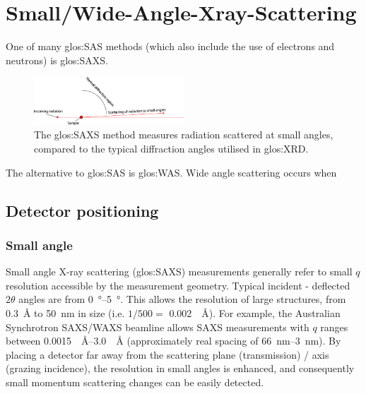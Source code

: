 \documentclass[../main.tex]{subfiles}
\begin{document}
	\chapter{Small/Wide-Angle-Xray-Scattering}\label{chap:05-saxs-waxs}
		One of many \gls{glos:SAS} methods (which also include the use of electrons and neutrons) is \gls{glos:SAXS}.
		
		\begin{figure}[H]
			\centering
			\includegraphics[width=0.5\textwidth]{resources/ch5/cm440881f1_hr}
			\caption{The \acrfull{glos:SAXS} method measures radiation scattered at small angles, compared to the typical diffraction angles utilised in \gls{glos:XRD}.}
			\label{fig:ch5-SAXS}
		\end{figure}
		
		The alternative to \gls{glos:SAS} is \gls{glos:WAS}. Wide angle scattering occurs when 
		
		\section{Detector positioning}
			\subsection{Small angle}
				Small angle X-ray scattering (\gls{glos:SAXS}) measurements generally refer to small $q$ resolution accessible by the measurement geometry. Typical incident - deflected $2\theta$ angles are from \qtyrange{0}{5}{\degree}. This allows the resolution of large structures, from \SI{0.3}{\angstrom} to \SI{50}{\nano\metre} in size (i.e. $1/500 = $ \SI{0.002}{\per\angstrom}). For example, the Australian Synchrotron SAXS/WAXS beamline allows SAXS measurements with $q$ ranges between \qtyrange{0.0015}{3.0}{\per\angstrom} (approximately real spacing of \qtyrange{66}{3}{\nano\metre}). By placing a detector far away from the scattering plane (transmission) / axis (grazing incidence), the resolution in small angles is enhanced, and consequently small momentum scattering changes can be easily detected.
			
\end{document}
